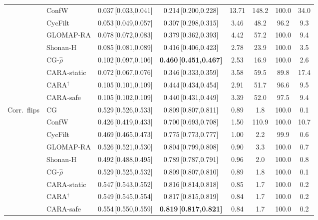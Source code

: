 \begin{table}[!htbp]
\begin{adjustbox}{max width=\textwidth,max totalheight=0.85\textheight}
\begin{tabular}{llcccccc}
 & ConfW & 0.037\,{\scriptsize[0.033,0.041]} & 0.214\,{\scriptsize[0.200,0.228]} & 13.71 & 148.2 & 100.0 & 34.0\\
 & CycFilt & 0.053\,{\scriptsize[0.049,0.057]} & 0.307\,{\scriptsize[0.298,0.315]} & 3.46 & 48.2 & 96.2 & 9.3\\
 & GLOMAP-RA & 0.078\,{\scriptsize[0.072,0.083]} & 0.379\,{\scriptsize[0.362,0.393]} & 4.42 & 57.2 & 100.0 & 9.4\\
 & Shonan-H & 0.085\,{\scriptsize[0.081,0.089]} & 0.416\,{\scriptsize[0.406,0.423]} & 2.78 & 23.9 & 100.0 & 3.5\\
 & CG-$\hat\rho$ & 0.102\,{\scriptsize[0.097,0.106]} & \textbf{0.460\,{\scriptsize[0.451,0.467]}} & 2.53 & 16.9 & 100.0 & 2.6\\
 & CARA-static & 0.072\,{\scriptsize[0.067,0.076]} & 0.346\,{\scriptsize[0.333,0.359]} & 3.58 & 59.5 & 89.8 & 17.4\\
 & CARA$^{\dagger}$ & 0.105\,{\scriptsize[0.101,0.109]} & 0.444\,{\scriptsize[0.434,0.454]} & 2.91 & 51.7 & 96.6 & 9.5\\
 & CARA-safe & 0.105\,{\scriptsize[0.102,0.109]} & 0.440\,{\scriptsize[0.431,0.449]} & 3.39 & 52.0 & 97.5 & 9.4\\
\midrule
Corr.\ flips & CG & 0.529\,{\scriptsize[0.526,0.533]} & 0.809\,{\scriptsize[0.807,0.811]} & 0.89 & 1.8 & 100.0 & 0.1\\
 & ConfW & 0.426\,{\scriptsize[0.419,0.433]} & 0.700\,{\scriptsize[0.693,0.708]} & 1.50 & 110.9 & 100.0 & 10.7\\
 & CycFilt & 0.469\,{\scriptsize[0.465,0.473]} & 0.775\,{\scriptsize[0.773,0.777]} & 1.00 & 2.2 & 99.9 & 0.6\\
 & GLOMAP-RA & 0.526\,{\scriptsize[0.521,0.530]} & 0.804\,{\scriptsize[0.799,0.808]} & 0.90 & 3.3 & 100.0 & 0.7\\
 & Shonan-H & 0.492\,{\scriptsize[0.488,0.495]} & 0.789\,{\scriptsize[0.787,0.791]} & 0.96 & 2.0 & 100.0 & 0.8\\
 & CG-$\hat\rho$ & 0.529\,{\scriptsize[0.525,0.532]} & 0.809\,{\scriptsize[0.807,0.810]} & 0.89 & 1.8 & 100.0 & 0.1\\
 & CARA-static & 0.547\,{\scriptsize[0.543,0.552]} & 0.816\,{\scriptsize[0.814,0.818]} & 0.85 & 1.7 & 100.0 & 0.2\\
 & CARA$^{\dagger}$ & 0.549\,{\scriptsize[0.545,0.554]} & 0.817\,{\scriptsize[0.815,0.819]} & 0.84 & 1.7 & 100.0 & 0.2\\
 & CARA-safe & 0.554\,{\scriptsize[0.550,0.559]} & \textbf{0.819\,{\scriptsize[0.817,0.821]}} & 0.84 & 1.7 & 100.0 & 0.2\\

\end{tabular}
\end{adjustbox}
\end{table}
